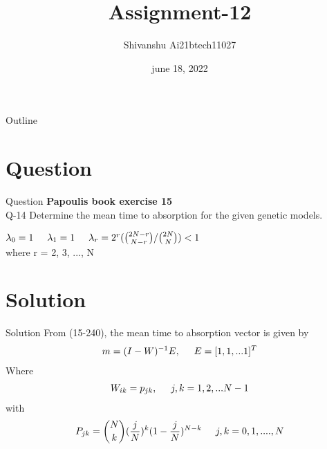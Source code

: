 \documentclass[15pt]{beamer}
\title{Assignment-12}
\author{Shivanshu  Ai21btech11027}
\date{june 18, 2022}
\begin{document}
\begin{frame}
    \titlepage 
\end{frame}

\begin{frame}{Outline}
    \tableofcontents
\end{frame}

    \section{Question}
    \begin{frame}{Question}
        \textbf{Papoulis book exercise 15}\\
        \large \noindent Q-14  Determine the mean time to absorption for the given genetic models.\\
        \begin{center}
             $\lambda_0 = 1 \hspace{5mm}\lambda_1 = 1 \hspace{5mm}\lambda_r = 2^r ({2N-r\choose N-r}/{2N\choose N}) < 1$ \\
             \vspace{5mm}
             where r = 2, 3, ..., N
        \end{center}
    \end{frame}
    \section{Solution}
    \begin{frame}{Solution}
        From (15-240), the mean time to absorption vector is given by 
        \begin{align}
            m = (I - W)^{-1}E ,\hspace{5mm} E = [1,1,...1]^T 
        \end{align}
        Where
        \begin{align}             
            W_{ik} = p_{jk}, \hspace{5mm} j,k = 1, 2, ...N-1
        \end{align}
        with 
        \begin{align}
            P_{jk} = {N\choose k} ( \dfrac{j}{N})^k  (1 - \frac{j}{N})^{N-k} \hspace{5mm} j,k = 0, 1, ...., N
        \end{align} 
    \end{frame}
\end{document}
